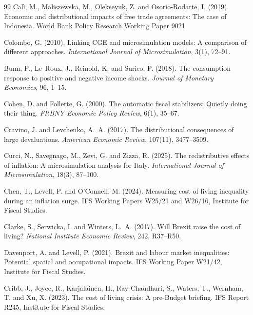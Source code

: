 \begin{thebibliography}{99}
Cal\`i, M., Maliszewska, M., Olekseyuk, Z. and Osorio-Rodarte, I. (2019).
\newblock Economic and distributional impacts of free trade agreements: The case of Indonesia.
\newblock World Bank Policy Research Working Paper 9021.

Colombo, G. (2010).
\newblock Linking CGE and microsimulation models: A comparison of different approaches.
\newblock \emph{International Journal of Microsimulation}, 3(1), 72--91.

Bunn, P., Le~Roux, J., Reinold, K. and Surico, P. (2018).
\newblock The consumption response to positive and negative income shocks.
\newblock \emph{Journal of Monetary Economics}, 96, 1--15.

Cohen, D. and Follette, G. (2000).
\newblock The automatic fiscal stabilizers: Quietly doing their thing.
\newblock \emph{FRBNY Economic Policy Review}, 6(1), 35--67.

Cravino, J. and Levchenko, A.~A. (2017).
\newblock The distributional consequences of large devaluations.
\newblock \emph{American Economic Review}, 107(11), 3477--3509.

Curci, N., Savegnago, M., Zevi, G. and Zizza, R. (2025).
\newblock The redistributive effects of inflation: A microsimulation analysis for Italy.
\newblock \emph{International Journal of Microsimulation}, 18(3), 87--100.

Chen, T., Levell, P. and O'Connell, M. (2024).
\newblock Measuring cost of living inequality during an inflation surge.
\newblock IFS Working Papers W25/21 and W26/16, Institute for Fiscal Studies.

Clarke, S., Serwicka, I. and Winters, L.~A. (2017).
\newblock Will Brexit raise the cost of living?
\newblock \emph{National Institute Economic Review}, 242, R37--R50.

Davenport, A. and Levell, P. (2021).
\newblock Brexit and labour market inequalities: Potential spatial and occupational impacts.
\newblock IFS Working Paper W21/42, Institute for Fiscal Studies.

Cribb, J., Joyce, R., Karjalainen, H., Ray-Chaudhuri, S., Waters, T., Wernham, T. and Xu, X. (2023).
\newblock The cost of living crisis: A pre-Budget briefing.
\newblock IFS Report R245, Institute for Fiscal Studies.


\end{thebibliography}
